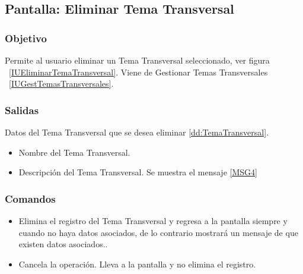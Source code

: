 \subsection{Pantalla: Eliminar Tema Transversal}

\subsubsection{Objetivo}
Permite al usuario eliminar un Tema Transversal seleccionado, ver figura ~\ref{IUEliminarTemaTransversal}. Viene de Gestionar Temas Transversales ~\ref{IUGestTemasTransversales}.


\subsubsection{Salidas}
  Datos del Tema Transversal que se desea eliminar \ref{dd:TemaTransversal}.
\begin{itemize}
\item Nombre del Tema Transversal.
\item Descripción del Tema Transversal. 
Se muestra el mensaje \ref{MSG4}
\end{itemize}


\subsubsection{Comandos}
\begin{itemize}
 \item {} Elimina el registro del Tema Transversal y regresa a la pantalla  siempre y cuando no haya datos asociados, de lo
contrario mostrará un mensaje de que existen datos asociados..
 \item {} Cancela la operación. Lleva a la pantalla  y no elimina el registro.

\end{itemize}
